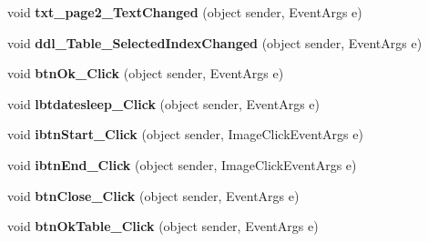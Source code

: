 \begin{DoxyCompactItemize}
\item 
\hypertarget{classusertrackmyhealth__sleep_a79f2ab0b8cf188f4edc7cc30deb6019e}{void {\bfseries txt\-\_\-page2\-\_\-\-Text\-Changed} (object sender, Event\-Args e)}\label{classusertrackmyhealth__sleep_a79f2ab0b8cf188f4edc7cc30deb6019e}

\item 
\hypertarget{classusertrackmyhealth__sleep_a73c5dd8a085e19ddfd295d945c8c64c9}{void {\bfseries ddl\-\_\-\-Table\-\_\-\-Selected\-Index\-Changed} (object sender, Event\-Args e)}\label{classusertrackmyhealth__sleep_a73c5dd8a085e19ddfd295d945c8c64c9}

\item 
\hypertarget{classusertrackmyhealth__sleep_a43755fab4041d08ecef16b0006a94c5f}{void {\bfseries btn\-Ok\-\_\-\-Click} (object sender, Event\-Args e)}\label{classusertrackmyhealth__sleep_a43755fab4041d08ecef16b0006a94c5f}

\item 
\hypertarget{classusertrackmyhealth__sleep_a1b7866f7d1dee70111570fde0973e8e4}{void {\bfseries lbtdatesleep\-\_\-\-Click} (object sender, Event\-Args e)}\label{classusertrackmyhealth__sleep_a1b7866f7d1dee70111570fde0973e8e4}

\item 
\hypertarget{classusertrackmyhealth__sleep_aa2b531d02fcb91b9f2198ce3dd94d2d3}{void {\bfseries ibtn\-Start\-\_\-\-Click} (object sender, Image\-Click\-Event\-Args e)}\label{classusertrackmyhealth__sleep_aa2b531d02fcb91b9f2198ce3dd94d2d3}

\item 
\hypertarget{classusertrackmyhealth__sleep_ad494e8d643be771a7861078f3ed9098e}{void {\bfseries ibtn\-End\-\_\-\-Click} (object sender, Image\-Click\-Event\-Args e)}\label{classusertrackmyhealth__sleep_ad494e8d643be771a7861078f3ed9098e}

\item 
\hypertarget{classusertrackmyhealth__sleep_adb1cf9ca99f73e0c755a00ce3911961a}{void {\bfseries btn\-Close\-\_\-\-Click} (object sender, Event\-Args e)}\label{classusertrackmyhealth__sleep_adb1cf9ca99f73e0c755a00ce3911961a}

\item 
\hypertarget{classusertrackmyhealth__sleep_a83aedd15dd6223954ba4451577acb785}{void {\bfseries btn\-Ok\-Table\-\_\-\-Click} (object sender, Event\-Args e)}\label{classusertrackmyhealth__sleep_a83aedd15dd6223954ba4451577acb785}

\end{DoxyCompactItemize}


